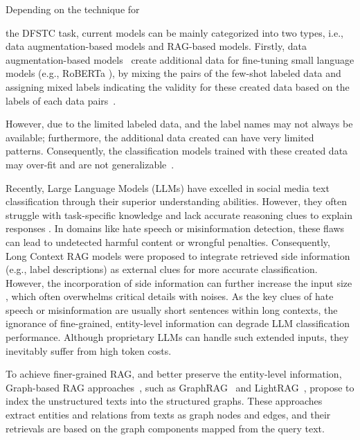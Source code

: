Depending on the technique for 

the DFSTC task,
current models can be mainly categorized into two types, i.e.,
data augmentation-based models and RAG-based models.
Firstly,
data augmentation-based models~\cite{meng2018weakly,meng2020text,xia-etal-2021-incremental} create additional data for fine-tuning small language models (e.g., RoBERTa \cite{liu2019roberta}), by mixing the pairs of the few-shot labeled data and assigning mixed labels indicating the validity for these created data based on the labels of each data pairs~\cite{xia-etal-2021-incremental}.


However, due to the limited labeled data, 
and the label names may not always be available;
furthermore, the additional data created can have very limited patterns. 
Consequently, the classification models trained with these created data may over-fit and are not generalizable~\cite{liu2023pre,liu2024liberating,lei2023tart}.


Recently, Large Language Models (LLMs) \cite{sun2021ernie, jiang2023mistral, touvron2023llama, achiam2023gpt, yang2024qwen2} have excelled in social media text classification through their superior understanding abilities. However, they often struggle with task-specific knowledge \cite{gao2023retrieval,zhang2023siren} and lack accurate reasoning clues to explain responses \cite{peng2024graph,wang2024kglink,dong2025understand,qian2025memorag}. In domains like hate speech or misinformation detection, these flaws can lead to undetected harmful content or wrongful penalties. Consequently, Long Context RAG models \cite{chen2023dense, sarthi2024raptor,xia-etal-2021-incremental,yoon2024compact} were proposed to integrate retrieved side information (e.g., label descriptions) as external clues for more accurate classification.
However, the incorporation of side information can further increase the input size \cite{chen2023dense}, which often overwhelms critical details with noises. As the key clues of hate speech or misinformation are usually short sentences within long contexts, the ignorance of fine-grained, entity-level information can degrade LLM classification performance. Although proprietary LLMs \cite{hurst2024gpt} can handle such extended inputs, they inevitably suffer from high token costs.


To achieve finer-grained RAG, and better preserve the entity-level information, Graph-based RAG approaches~\cite{edge2024local,guo2024lightrag,gutierrez2024hipporag,peng2024graph,zhang2025survey,han2024retrieval,gutiérrez2025ragmemory}, such as GraphRAG~\cite{edge2024local} and LightRAG~\cite{guo2024lightrag}, 
	propose to index the unstructured texts into the structured graphs. 
	These approaches extract entities and relations from texts as graph nodes and edges, and their retrievals are based on the graph components mapped from the query text.
	
